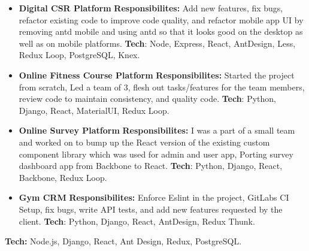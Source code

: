 \documentclass[11pt, a4paper]{article}
\begin{document}
\begin{flushleft}
\begin{itemize}
    \item {\bf{Digital CSR Platform}}
    \newline
    \textbf{Responsibilites:} Add new features, fix bugs, refactor existing code to improve code quality, and refactor mobile app UI by removing antd mobile and using antd so that it looks good on the desktop as well as on mobile platforms.
    \newline
    \textbf{Tech}: Node, Express, React, AntDesign, Less, Redux Loop, PostgreSQL, Knex.

    \item \textbf{Online Fitness Course Platform}
    \newline
    \textbf{Responsibilites:} Started the project from scratch, Led a team of 3, flesh out tasks/features for the team members, review code to maintain consistency, and quality code.
    \newline
    \textbf{Tech}: Python, Django, React, MaterialUI, Redux Loop.

    \item \textbf{Online Survey Platform}
    \newline
    \textbf{Responsibilites:} I was a part of a small team and worked on to bump up the React version of the existing custom component library which was used for admin and user app, Porting survey dashboard app from Backbone to React.
    \newline
    \textbf{Tech}: Python, Django, React, Backbone, Redux Loop.

    \item \textbf{Gym CRM}
    \newline
    \textbf{Responsibilites:} Enforce Eslint in the project, GitLabs CI Setup, fix bugs, write API tests, and add new features requested by the client.
    \newline
    \textbf{Tech}: Python, Django, React, AntDesign, Redux Thunk.
    \newline
\end{itemize}

\end{flushleft}

\textbf{Tech:} Node.js, Django, React, Ant Design, Redux, PostgreSQL.
\end{document}
